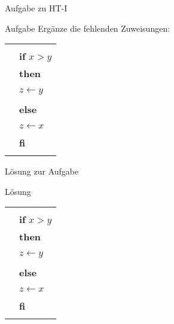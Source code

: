 \begin{frame}{Aufgabe zu HT-I}
	\begin{exampleblock}{Aufgabe}
		Ergänze die fehlenden Zuweisungen:
		\small 
		\begin{tabular}{rl}
			&\HTB{$x=a \wedge y=b$}\\
			&\textbf{if} $x>y$\\
			&\textbf{then}\\
			&\qquad \HTB{...}\\
			&\qquad $z \leftarrow y$\\
			&\qquad \HTB{...}\\
			&\textbf{else}\\
			&\qquad \HTB{...}\\
			&\qquad $z \leftarrow x$\\
			&\qquad \HTB{...}\\
			&\textbf{fi}\\
			&\HTB{$x=a \wedge y=b \wedge z=min(a,b)$}
		\end{tabular}
	\end{exampleblock}
\end{frame}

\begin{frame}{Lösung zur Aufgabe}
	\begin{block}{Lösung}
		\small 
		\begin{tabular}{rl}
			&\HTB{$x=a \wedge y=b$}\\
			&\textbf{if} $x>y$\\
			&\textbf{then}\\
			&\qquad \HTB{$x=a \wedge y=b \wedge x>y$}\\
			&\qquad $z \leftarrow y$\\
			&\qquad \HTB{$x=a \wedge y=b \wedge z=min(a,b)$}\\
			&\textbf{else}\\
			&\qquad \HTB{$x=a \wedge y=b \wedge x\le y$}\\
			&\qquad $z \leftarrow x$\\
			&\qquad \HTB{$x=a \wedge y=b \wedge z=min(a,b)$}\\
			&\textbf{fi}\\
			&\HTB{$x=a \wedge y=b \wedge z=min(a,b)$}
		\end{tabular}
	\end{block}
\end{frame}


